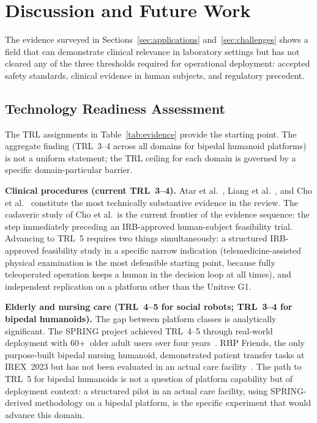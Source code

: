 ﻿%
\section{Discussion and Future Work}
\label{sec:discussion}

The evidence surveyed in Sections~\ref{sec:applications} and~\ref{sec:challenges}
shows a field that can demonstrate clinical relevance in laboratory settings but
has not cleared any of the three thresholds required for operational deployment:
accepted safety standards, clinical evidence in human subjects, and regulatory
precedent.

\subsection{Technology Readiness Assessment}
\label{sec:trl}

The TRL assignments in Table~\ref{tab:evidence} provide the starting point. The
aggregate finding (TRL~3--4 across all domains for bipedal humanoid
platforms) is not a uniform statement; the TRL ceiling for each domain is
governed by a specific domain-particular barrier.

\textbf{Clinical procedures (current TRL~3--4).} Atar et
al.~\cite{atar2025humanoids}, Liang et al.~\cite{liang2025lapsurgie}, and Cho et
al.~\cite{cho2026humanoid} constitute the most technically substantive evidence
in the review. The cadaveric study of Cho et al.\ is the current frontier of the
evidence sequence: the step immediately preceding an IRB-approved human-subject
feasibility trial. Advancing to TRL~5 requires two things simultaneously: a
structured IRB-approved feasibility study in a specific narrow indication
(telemedicine-assisted physical examination is the most defensible starting point,
because fully teleoperated operation keeps a human in the decision loop at all
times), and independent replication on a platform other than the Unitree G1.

\textbf{Elderly and nursing care (TRL~4--5 for social robots; TRL~3--4 for
bipedal humanoids).} The gap between platform classes is analytically significant.
The SPRING project achieved TRL~4--5 through real-world deployment with 60+~older
adult users over four years~\cite{alamedapineda2024spring}. RHP
Friends, the only purpose-built bipedal nursing humanoid, demonstrated patient
transfer tasks at IREX~2023 but has not been evaluated in an actual care
facility~\cite{benallegue2025rhp}. The path to TRL~5 for bipedal humanoids is
not a question of platform capability but of deployment context: a structured
pilot in an actual care facility, using SPRING-derived methodology on a bipedal
platform, is the specific experiment that would advance this domain.


